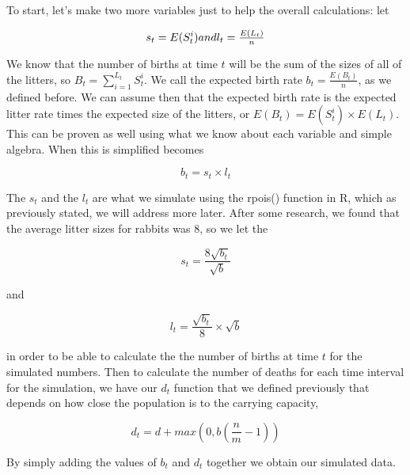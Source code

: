 \documentclass{article}\usepackage[]{graphicx}\usepackage[]{color}
\begin{document}
To start, let's make two more variables just to help the overall calculations: let 

\begin{equation}
s_t = E(S_t^i)$$ and $$l_t = \frac{E(L_t)}{n}
\end{equation}

\noindent We know that the number of births at time \(t\) will be the sum of the sizes of all of the litters, so \(B_t = \sum_{i=1}^{L_t} S_t^i\). We call the expected birth rate \(b_t = \frac{E(B_t)}{n}\), as we defined before. We can assume then that the expected birth rate is the expected litter rate times the expected size of the litters, or \(E(B_t) = E(S_t^i)\times E(L_t)\). This can be proven as well using what we know about each variable and simple algebra. When this is simplified becomes 

\begin{equation}
b_t = s_t\times l_t
\end{equation}

The \(s_t\) and the \(l_t\) are what we simulate using the rpois() function in R, which as previously stated, we will address more later. After some research, we found that the average litter sizes for rabbits was \(8\), so we let the 

\begin{equation}
s_t = \frac{8\sqrt{b_t}}{\sqrt{b}}
\end{equation}

and 

\begin{equation}
l_t = \frac{\sqrt{b_t}}{8}\times \sqrt{b}
\end{equation}

\noindent in order to be able to calculate the the number of births at time \(t\) for the simulated numbers. Then to calculate the number of deaths for each time interval for the simulation, we have our \(d_t\) function that we defined previously that depends on how close the population is to the carrying capacity, 

\begin{equation}
d_t = d + max(0, b(\frac{n}{m}-1))
\end{equation}

\noindent By simply adding the values of \(b_t\) and \(d_t\) together we obtain our simulated data.
\end{document}
